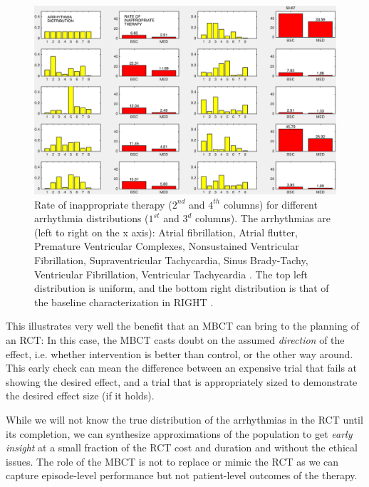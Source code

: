 \begin{figure}[t]
	\vspace{-10pt}
\centering
\vspace{-10pt}
\includegraphics[scale=0.4]{figures/popvar9}
\caption{\small Rate of inappropriate therapy ($2^{nd}$ and $4^{th}$ columns) for different arrhythmia distributions ($1^{st}$ and $3^d$ columns). The arrhythmias are (left to right on the x axis): Atrial fibrillation, Atrial flutter, Premature Ventricular Complexes, Nonsustained Ventricular Fibrillation, Supraventricular Tachycardia, Sinus Brady-Tachy, Ventricular Fibrillation, Ventricular Tachycardia \cite{josephson}. The top left distribution is uniform, and the bottom right distribution is that of the baseline characterization in RIGHT \cite{GoldABBTB11_RIGHTresults}.}
\label{fig:popvar8}
\end{figure}

This illustrates very well the benefit that an \ac{MBCT} can bring to the planning of an \ac{RCT}: 
In this case, the \ac{MBCT} casts doubt on the assumed \emph{direction} of the effect, i.e. whether intervention is better than control, or the other way around.
This early check can mean the difference between an expensive trial that fails at showing the desired effect, and a trial that is appropriately sized to demonstrate the desired effect size (if it holds).

While we will not know the true distribution of the arrhythmias in the \ac{RCT} until its completion, we can synthesize approximations of the population to get \emph{early insight} at a small fraction of the RCT cost and duration and without the ethical issues. 
The role of the MBCT is not to replace or mimic the RCT as we can capture episode-level performance but not patient-level outcomes of the therapy. 


